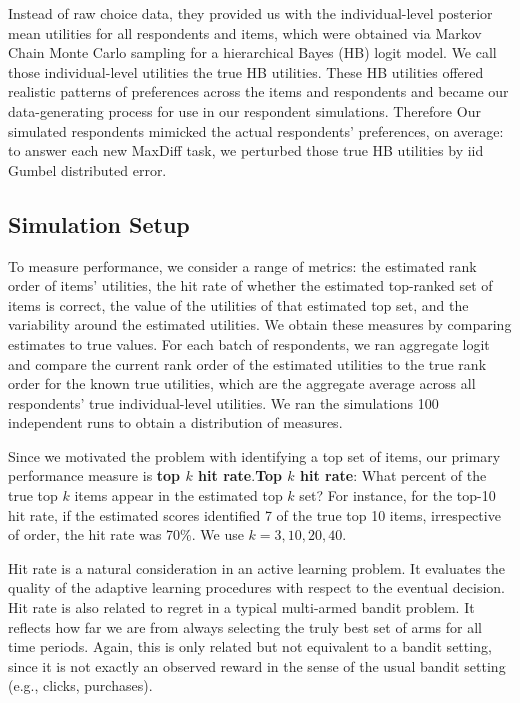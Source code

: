 \documentclass[a4paper,12pt]{article}
\begin{document}
Instead of raw choice data, they provided us with the individual-level posterior mean utilities for all respondents and items, which were obtained via Markov Chain Monte Carlo sampling for a hierarchical Bayes (HB) logit model. We call those individual-level utilities the true HB utilities.  These HB utilities offered realistic patterns of preferences across the items and respondents and became our data-generating process for use in our respondent simulations.  Therefore Our simulated respondents mimicked the actual respondents' preferences, on average: to answer each new MaxDiff task, we perturbed those true HB utilities by iid Gumbel distributed error.  

\subsection{Simulation Setup}
To measure performance, we consider a range of metrics: the estimated rank order of items' utilities, the hit rate of whether the estimated top-ranked set of items is correct, the value of the utilities of that estimated top set, and the variability around the estimated utilities. We obtain these measures by comparing estimates to true values. For each batch of respondents, we ran aggregate logit and compare the current rank order of the estimated utilities to the true rank order for the known true utilities, which are the aggregate average across all respondents' true individual-level utilities. We ran the simulations 100 independent runs to obtain a distribution of measures. 

Since we motivated the problem with identifying a top set of items, our primary performance measure is \textbf{top $k$ hit rate}.\textbf{Top $k$ hit rate}: What percent of the true top $k$ items appear in the estimated top $k$ set? For instance, for the top-10 hit rate, if the estimated scores identified 7 of the true top 10 items, irrespective of order, the hit rate was 70\%. We use $k=3,10,20,40$. 

Hit rate is a natural consideration in an active learning problem. It evaluates the quality of the adaptive learning procedures with respect to the eventual decision. Hit rate is also related to regret in a typical multi-armed bandit problem. It reflects how far we are from always selecting the truly best set of arms for all time periods. Again, this is only related but not equivalent to a bandit setting, since it is not exactly an observed reward in the sense of the usual bandit setting (e.g., clicks, purchases). 
\end{document}
